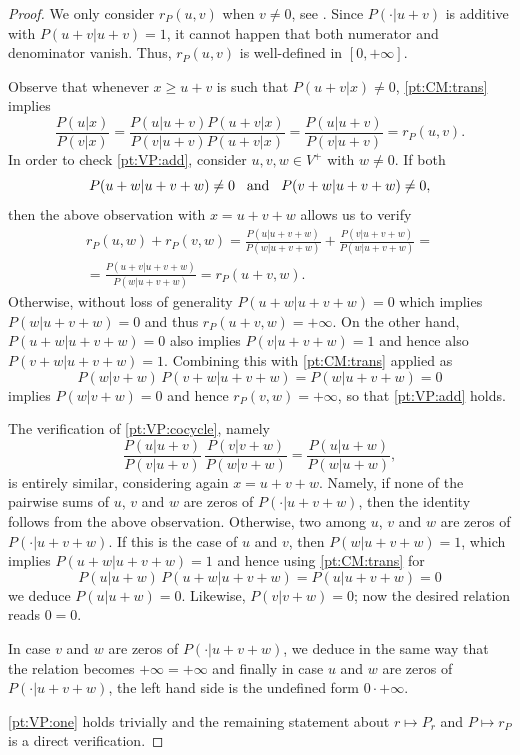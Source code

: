 \documentclass[11pt]{amsart}
\numberwithin{equation}{section}
\theoremstyle{definition}
\theoremstyle{definition}
\begin{document}
\begin{proof}
We only consider $r_P(u,v)$ when $v\neq 0$, see . Since $P(\cdot| u+v)$ is additive with $P(u+v| u+v)=1$, it cannot happen that both numerator and denominator vanish. Thus, $r_P(u,v)$ is well-defined in $[0, +\infty]$.

Observe that whenever $x\geq u+v$ is such that $P(u+v|x) \neq 0$, \ref{pt:CM:trans} implies
\begin{equation*}
\frac{P(u|x)}{P(v|x)} = \frac{P(u|u+v) P(u+v|x)}{P(v|u+v) P(u+v|x)} = \frac{P(u|u+v)}{P(v|u+v)} =r_P(u,v).
\end{equation*}
In order to check \ref{pt:VP:add}, consider $u,v,w\in V^+$ with $w\neq 0$. If both
\begin{equation*}
P(u+w|u+v+w) \neq 0 \kern3mm \text{and} \kern3mm  P(v+w|u+v+w)\neq 0,
\end{equation*}
then the above observation with $x=u+v+w$ allows us to verify
\begin{multline*}
r_P(u, w) + r_P(v, w) = \frac{P(u|u+v+w)}{P(w|u+v+w)} +  \frac{P(v|u+v+w)}{P(w|u+v+w)} =  \\
= \frac{P(u+v|u+v+w)}{P(w|u+v+w)} = r_P(u+v, w).
\end{multline*}
Otherwise, without loss of generality $P(u+w|u+v+w)=0$ which implies $P(w|u+v+w)=0$ and thus $r_P(u+v, w)=+\infty$. On the other hand, $P(u+w|u+v+w)=0$ also implies $P(v|u+v+w)=1$ and hence also $P(v+w|u+v+w)=1$. Combining this with \ref{pt:CM:trans} applied as
\begin{equation*}
P(w|v+w) \, P(v+w|u+v+w) = P(w|u+v+w)=0
\end{equation*}
implies $P(w|v+w)=0$ and hence $r_P(v, w)=+\infty$, so that \ref{pt:VP:add} holds.

The verification of \ref{pt:VP:cocycle}, namely
\begin{equation*}
\frac{P(u|u+v)}{P(v|u+v)} \, \frac{P(v|v+w)}{P(w|v+w)} =\frac{P(u|u+w)}{P(w|u+w)},
\end{equation*}
is entirely similar, considering again $x=u+v+w$. Namely, if none of the pairwise sums of $u$, $v$ and $w$ are zeros of $P(\cdot|u+v+w)$, then the identity follows from the above observation. Otherwise, two among $u$, $v$ and $w$ are zeros of $P(\cdot|u+v+w)$. If this is the case of $u$  and $v$, then $P(w|u+v+w)=1$, which implies $P(u+w|u+v+w)=1$ and hence using \ref{pt:CM:trans} for
\begin{equation*}
P(u|u+w) \, P(u+w|u+v+w) = P(u|u+v+w)=0
\end{equation*}
we deduce $P(u|u+w)=0$. Likewise, $P(v|v+w)=0$; now the desired relation reads $0=0$. 

In case $v$ and $w$ are zeros of $P(\cdot|u+v+w)$, we deduce in the same way that the relation becomes $+\infty=+\infty$ and finally in case $u$ and $w$ are zeros of $P(\cdot|u+v+w)$, the left hand side is the undefined form $0\cdot+\infty$.

\ref{pt:VP:one} holds trivially and the remaining statement about $r\mapsto P_r$ and $P\mapsto r_P$ is a direct verification.
\end{proof}
\end{document}
